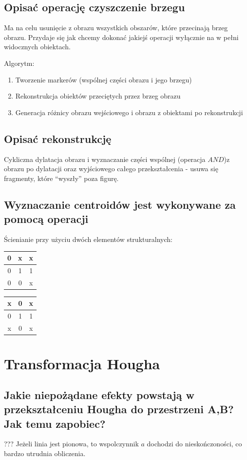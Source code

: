 \documentclass[a4paper, 12pt, titlepage]{article}
\begin{document}
\subsection{Opisać operację czyszczenie brzegu}
Ma na celu usunięcie z obrazu wszystkich obszarów, które przecinają brzeg obrazu. Przydaje się jak chcemy dokonać jakiejś operacji wyłącznie na w pełni widocznych obiektach. \par
Algorytm:
\begin{enumerate}[noitemsep]
	\item Tworzenie markerów (wspólnej części obrazu i jego brzegu)
	\item Rekonstrukcja obiektów przeciętych przez brzeg obrazu
	\item Generacja różnicy obrazu wejściowego i obrazu z obiektami po rekonstrukcji
\end{enumerate}

\subsection{Opisać rekonstrukcję}
Cykliczna dylatacja obrazu i wyznaczanie części wspólnej (operacja $AND$)z obrazu po dylatacji oraz wyjściowego całego przekształcenia - usuwa się fragmenty, które “wyszły” poza figurę.

\subsection{Wyznaczanie centroidów jest wykonywane za pomocą operacji}
Ścienianie przy użyciu dwóch elementów strukturalnych:
\begin{tabular}{|c|c|c|}
	\hline
	0 & x & x \\ \hline
	0 & 1 & 1 \\ \hline
	0 & 0 & x \\ \hline
\end{tabular} 
\begin{tabular}{|c|c|c|}
	\hline
	x & 0 & x \\ \hline
	0 & 1 & 1 \\ \hline
	x & 0 & x \\ \hline
\end{tabular} 

\pagebreak\section{Transformacja Hougha}
\subsection{Jakie niepożądane efekty powstają w przekształceniu Hougha do przestrzeni A,B? Jak temu zapobiec?} ???
Jeżeli linia jest pionowa, to wspolczynnik $a$ dochodzi do nieskończoności, co bardzo utrudnia obliczenia.
\end{document}

